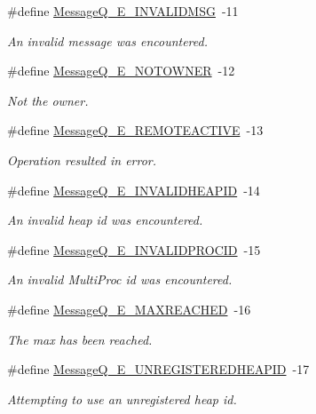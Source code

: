\begin{DoxyCompactItemize}
\#define \hyperlink{_message_q_8h_abb81e5b9fa7bd062de50e485cd812455}{MessageQ\_\-E\_\-INVALIDMSG}~-\/11
\begin{DoxyCompactList}\small\item\em An invalid message was encountered. \item\end{DoxyCompactList}\item 
\#define \hyperlink{_message_q_8h_af8e0e7cec06ca6f23694547f0c3737e0}{MessageQ\_\-E\_\-NOTOWNER}~-\/12
\begin{DoxyCompactList}\small\item\em Not the owner. \item\end{DoxyCompactList}\item 
\#define \hyperlink{_message_q_8h_a13e31752ee00b731e2cb9a49d101409b}{MessageQ\_\-E\_\-REMOTEACTIVE}~-\/13
\begin{DoxyCompactList}\small\item\em Operation resulted in error. \item\end{DoxyCompactList}\item 
\#define \hyperlink{_message_q_8h_a1d39a4db7701897b3160afdba7ba8827}{MessageQ\_\-E\_\-INVALIDHEAPID}~-\/14
\begin{DoxyCompactList}\small\item\em An invalid heap id was encountered. \item\end{DoxyCompactList}\item 
\#define \hyperlink{_message_q_8h_a00768dde3394e2ec03ee7b7b077fdac5}{MessageQ\_\-E\_\-INVALIDPROCID}~-\/15
\begin{DoxyCompactList}\small\item\em An invalid MultiProc id was encountered. \item\end{DoxyCompactList}\item 
\#define \hyperlink{_message_q_8h_aaa9c3ea12ca80e1d3ee4d0d2e30df7aa}{MessageQ\_\-E\_\-MAXREACHED}~-\/16
\begin{DoxyCompactList}\small\item\em The max has been reached. \item\end{DoxyCompactList}\item 
\#define \hyperlink{_message_q_8h_a62a3fe6b3b29f33cb5b148ca7c0e4a17}{MessageQ\_\-E\_\-UNREGISTEREDHEAPID}~-\/17
\begin{DoxyCompactList}\small\item\em Attempting to use an unregistered heap id. \item\end{DoxyCompactList}\item 

\end{DoxyCompactItemize}
